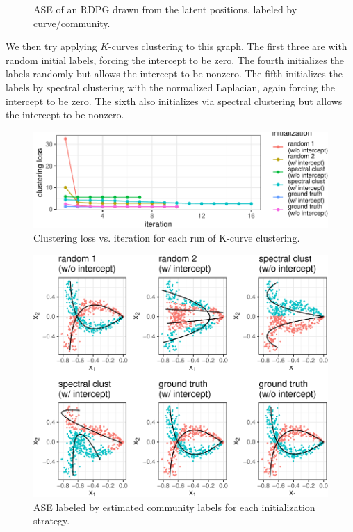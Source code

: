 \documentclass[12pt]{article}
\begin{document}
\begin{example}
\begin{figure}[H]
{}

\caption{ASE of an RDPG drawn from the latent positions, labeled by curve/community.}\label{fig:unnamed-chunk-3}
\end{figure}

We then try applying $K$-curves clustering to this graph. 
The first three are with random initial labels, forcing the intercept to be zero. 
The fourth initializes the labels randomly but allows the intercept to be nonzero. 
The fifth initializes the labels by spectral clustering with the normalized Laplacian, again forcing the intercept to be zero. 
The sixth also initializes via spectral clustering but allows the intercept to be nonzero. 



\begin{figure}[H]

{\centering \includegraphics{draft_files/figure-latex/unnamed-chunk-5-1} 

}

\caption{Clustering loss vs. iteration for each run of K-curve clustering.}\label{fig:unnamed-chunk-5}
\end{figure}

\begin{figure}[H]

{\centering \includegraphics{draft_files/figure-latex/unnamed-chunk-6-1} 

}

\caption{ASE labeled by estimated community labels for each initialization strategy.}\label{fig:unnamed-chunk-6}
\end{figure}

\end{example}
\end{document}
